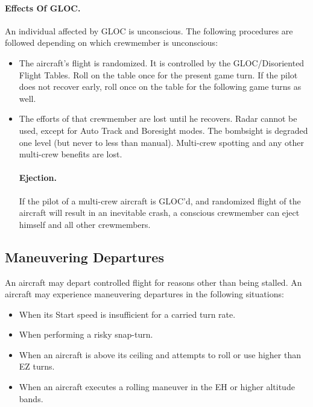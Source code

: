 \paragraph{Effects Of GLOC.} An individual affected by GLOC is unconscious. The following procedures are followed depending on which crewmember is unconscious:

\begin{itemize}

    \item{} The aircraft's flight is randomized. It is controlled by the GLOC/Disoriented Flight Tables. Roll on the table once for the present game turn. If the pilot does not recover early, roll once on the table for the following game turns as well.

    \item{} The efforts of that crewmember are lost until he recovers. Radar cannot be used, except for Auto Track and Boresight modes. The bombsight is degraded one level (but never to less than manual). Multi-crew spotting and any other multi-crew benefits are lost.

    \paragraph{Ejection.} If the pilot of a multi-crew aircraft is GLOC'd, and randomized flight of the aircraft will result in an inevitable crash, a conscious crewmember can eject himself and all other crewmembers.

\end{itemize}

\subsection{Maneuvering Departures}

An aircraft may depart controlled flight for reasons other than being stalled. An aircraft may experience maneuvering departures in the following situations:

\begin{itemize}

    \item When its Start speed is insufficient for a carried turn rate.

    \item When performing a risky snap-turn.

    \item When an aircraft is above its ceiling and attempts to roll or use higher than EZ turns.

    \item When an aircraft executes a rolling maneuver in the EH or higher altitude bands.

\end{itemize}

